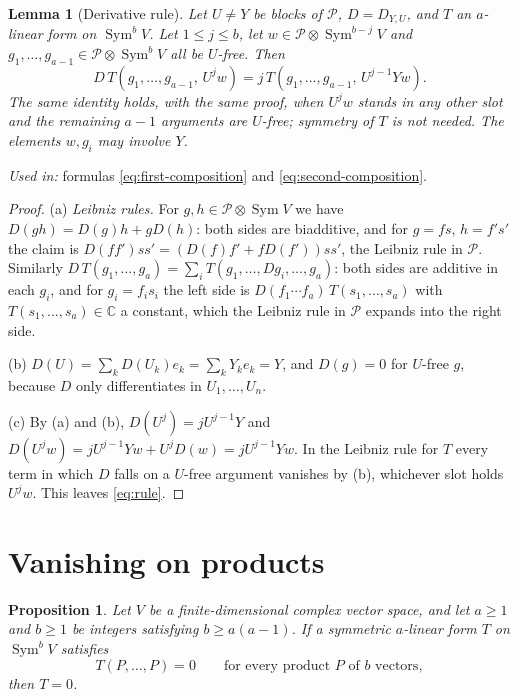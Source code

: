 \documentclass[11pt]{article}
\newtheorem{proposition}[theorem]{Proposition}
\newtheorem{lemma}[theorem]{Lemma}
\theoremstyle{remark}
\DeclareMathOperator{\Sym}{Sym}
\newcommand{\C}{\mathbb C}
\newcommand{\D}[2]{D_{#1,#2}}
\newcommand{\PP}{\mathcal P}
\begin{document}
\begin{lemma}[Derivative rule]\label{lem:deriv}
Let $U\ne Y$ be blocks of $\PP$, $D=\D{Y}{U}$, and $T$ an $a$-linear form
on $\Sym^bV$. Let $1\le j\le b$, let $w\in\PP\otimes\Sym^{b-j}V$ and
$g_1,\dots,g_{a-1}\in\PP\otimes\Sym^bV$ all be $U$-free. Then
\begin{equation}\label{eq:rule}
 D\,T(g_1,\dots,g_{a-1},\,U^jw)
 =j\,T(g_1,\dots,g_{a-1},\,U^{j-1}Yw).
\end{equation}
The same identity holds, with the same proof, when $U^jw$ stands in any
other slot and the remaining $a-1$ arguments are $U$-free; symmetry of $T$
is not needed. The elements $w,g_i$ may involve $Y$.
\end{lemma}

\noindent\emph{Used in:} formulas \eqref{eq:first-composition} and
\eqref{eq:second-composition}.

\begin{proof}
(a) \emph{Leibniz rules.} For $g,h\in\PP\otimes\Sym V$ we have
$D(gh)=D(g)h+gD(h)$: both sides are biadditive, and for $g=fs$, $h=f's'$
the claim is $D(ff')ss'=(D(f)f'+fD(f'))ss'$, the Leibniz rule in $\PP$.
Similarly
$D\,T(g_1,\dots,g_a)=\sum_iT(g_1,\dots,Dg_i,\dots,g_a)$: both sides are
additive in each $g_i$, and for $g_i=f_is_i$ the left side is
$D(f_1\cdots f_a)\,T(s_1,\dots,s_a)$ with $T(s_1,\dots,s_a)\in\C$ a
constant, which the Leibniz rule in $\PP$ expands into the right side.

(b) $D(U)=\sum_kD(U_k)e_k=\sum_kY_ke_k=Y$, and $D(g)=0$ for $U$-free $g$,
because $D$ only differentiates in $U_1,\dots,U_n$.

(c) By (a) and (b), $D(U^j)=jU^{j-1}Y$ and
$D(U^jw)=jU^{j-1}Yw+U^jD(w)=jU^{j-1}Yw$. In the Leibniz rule for $T$ every
term in which $D$ falls on a $U$-free argument vanishes by (b), whichever
slot holds $U^jw$. This leaves \eqref{eq:rule}.
\end{proof}

\section{Vanishing on products}\label{sec:vanishing}

\begin{proposition}\label{prop:vanishing}
Let $V$ be a finite-dimensional complex vector space, and let $a\ge1$ and
$b\ge1$ be integers satisfying $b\ge a(a-1)$.
If a symmetric $a$-linear form $T$ on $\Sym^b V$ satisfies
\begin{equation}\label{eq:diagonal}
 T(P,\ldots,P)=0
 \qquad\text{for every product $P$ of $b$ vectors},
\end{equation}
then $T=0$.
\end{proposition}
\end{document}
